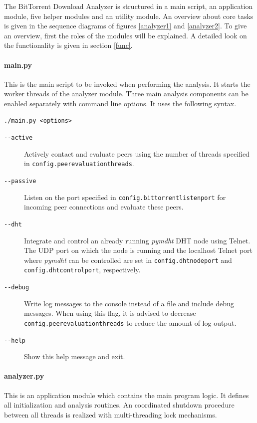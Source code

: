 \documentclass[10pt, a4paper, twoside, headsepline]{scrbook}
\renewcommand{\_}{\origunderscore\allowbreak}
\newcommand{\config}[1]{\texttt{config.\allowbreak #1}}
\begin{document}
The BitTorrent Download Analyzer is structured in a main script, an application module, five helper modules and an utility module. An overview about core tasks is given in the sequence diagrams of figures \ref{analyzer1} and \ref{analyzer2}. To give an overview, first the roles of the modules will be explained. A detailed look on the functionality is given in section \ref{func}.

\paragraph{main.py} This is the main script to be invoked when performing the analysis. It starts the worker threads of the analyzer module. Three main analysis components can be enabled separately with command line options. It uses the following syntax.
\begin{lstlisting}
./main.py <options>
\end{lstlisting}
\begin{description}
\item[\texttt{-{}-active}] Actively contact and evaluate peers using the number of threads specified in \config{peer\_evaluation\_threads}.
\item[\texttt{-{}-passive}] Listen on the port specified in \config{bittorrent\_listen\_port} for incoming peer connections and evaluate these peers.
\item[\texttt{-{}-dht}] Integrate and control an already running \emph{pymdht} DHT node using Telnet. The UDP port on which the node is running and the localhost Telnet port where \emph{pymdht} can be controlled are set in \config{dht\_node\_port} and \config{dht\_control\_port}, respectively.
\item[\texttt{-{}-debug}] Write log messages to the console instead of a file and include debug messages. When using this flag, it is advised to decrease \config{peer\_evaluation\_threads} to reduce the amount of log output.
\item[\texttt{-{}-help}] Show this help message and exit.
\end{description}

\paragraph{analyzer.py} This is an application module which contains the main program logic. It defines all initialization and analysis routines. An coordinated shutdown procedure between all threads is realized with multi-threading lock mechanisms.
\end{document}
